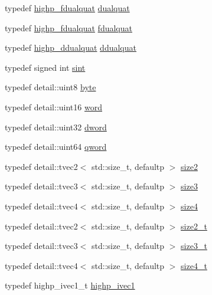 \begin{CompactItemize}
\item 
typedef \hyperlink{group__gtc__dual__quaternion_g2ed3283c09d3ffaf52a0e0a4b248eab6}{highp\_\-fdualquat} \hyperlink{group__gtc__dual__quaternion_g2f6227b5f9dc08a2e7682065a84b3aa9}{dualquat}
\item 
typedef \hyperlink{group__gtc__dual__quaternion_g2ed3283c09d3ffaf52a0e0a4b248eab6}{highp\_\-fdualquat} \hyperlink{group__gtc__dual__quaternion_g436906129bc69ca5059555cafcbac9fd}{fdualquat}
\item 
typedef \hyperlink{group__gtc__dual__quaternion_g61b654c21f080135aedcf23461eb1037}{highp\_\-ddualquat} \hyperlink{group__gtc__dual__quaternion_g373431ffdd82d5c03c258217a9e1f1a6}{ddualquat}
\item 
typedef signed int \hyperlink{group__gtx__integer_g73643e09d8c6d362418aec541fdb987d}{sint}
\item 
typedef detail::uint8 \hyperlink{group__gtx__raw__data_gcd7fe1f2ad60a57f7d7ad4f1e6836efd}{byte}
\item 
typedef detail::uint16 \hyperlink{group__gtx__raw__data_g5617a479d471021b5c773c5e969ba46d}{word}
\item 
typedef detail::uint32 \hyperlink{group__gtx__raw__data_g1fc2589df6d44e923cd1820cf14805cf}{dword}
\item 
typedef detail::uint64 \hyperlink{group__gtx__raw__data_g32447af289e879589883c9b7e3be1246}{qword}
\item 
typedef detail::tvec2$<$ std::size\_\-t, defaultp $>$ \hyperlink{group__gtx__std__based__type_g393e8beba20ea33452384087a2864f86}{size2}
\item 
typedef detail::tvec3$<$ std::size\_\-t, defaultp $>$ \hyperlink{group__gtx__std__based__type_ge1dda4cdccd4c1abeeb2e470c048d0c9}{size3}
\item 
typedef detail::tvec4$<$ std::size\_\-t, defaultp $>$ \hyperlink{group__gtx__std__based__type_gc04a40cfe44b5035770cf26d98a9349d}{size4}
\item 
typedef detail::tvec2$<$ std::size\_\-t, defaultp $>$ \hyperlink{group__gtx__std__based__type_g64be170f9203528ff59efa40b1977bb0}{size2\_\-t}
\item 
typedef detail::tvec3$<$ std::size\_\-t, defaultp $>$ \hyperlink{group__gtx__std__based__type_gd9ddaab6dd4c37ba46b74a1423ef2ba3}{size3\_\-t}
\item 
typedef detail::tvec4$<$ std::size\_\-t, defaultp $>$ \hyperlink{group__gtx__std__based__type_gaaf9b6a73135945e356601a01beece30}{size4\_\-t}
\item 
typedef highp\_\-ivec1\_\-t \hyperlink{namespaceglm_ddb6724b01f125e2730aeaad6130b06f}{highp\_\-ivec1}

\end{CompactItemize}
